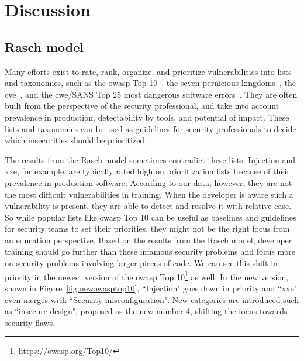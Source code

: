 \section{Discussion}
\label{sec:its-discussion}

\subsection{Rasch model}
Many efforts exist to rate, rank, organize, and prioritize vulnerabilities into lists and taxonomies, such as the \gls{owasp} Top 10~\cite{wichers2017owasp}, the seven pernicious kingdoms~\cite{tsipenyuk2005seven}, the \gls{cve}~\cite{guo2009ontology,mann1999towards,baker1999development}, and the \gls{cwe}/SANS Top 25 most dangerous software errors~\cite{martin20112011}.
They are often built from the perspective of the security professional, and take into account prevalence in production, detectability by tools, and potential of impact.
These lists and taxonomies can be used as guidelines for security professionals to decide which insecurities should be prioritized.

The results from the Rasch model sometimes contradict these lists.
Injection and \gls{xxe}, for example, are typically rated high on prioritization lists because of their prevalence in production software.
According to our data, however, they are not the most difficult vulnerabilities in training.
When the developer is aware such a vulnerability is present, they are able to detect and resolve it with relative ease.
So while popular lists like \gls{owasp} Top 10 can be useful as baselines and guidelines for security teams to set their priorities, they might not be the right focus from an education perspective.
Based on the results from the Rasch model, developer training should go further than these infamous security problems and focus more on security problems involving larger pieces of code.
We can see this shift in priority in the newest version of the \gls{owasp} Top 10\footnote{\url{https://owasp.org/Top10/}} as well.
In the new version, shown in Figure~\ref{fig:newowasptop10}, ``Injection" goes down in priority and ``\gls{xxe}" even merges with ``Security misconfiguration".
New categories are introduced such as ``insecure design", proposed as the new number 4, shifting the focus towards security flaws.

